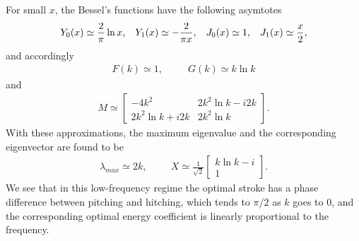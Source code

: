 For small $x$, the Bessel's functions have the following asymtotes
\begin{align}
Y_0(x)  \simeq  \frac{2}{\pi} \ln x,  \hspace{3mm} 
Y_1(x)  \simeq  -\frac{2}{\pi x}, \hspace{3mm}
J_0(x) \simeq 1, \hspace{3mm}
J_1(x) \simeq \frac{x}{2},
\end{align}
and accordingly
\begin{align}
F(k) \simeq 1,  \hspace{30pt}   G(k) \simeq k \ln k
\end{align}
and
\begin{align}
M \simeq \begin{bmatrix} 
-4k^2   &  2k^2 \ln k - i2k  \\
2k^2 \ln k + i2k  &   2k^2 \ln k 
\end{bmatrix}.
\end{align}
With these approximations, the maximum eigenvalue and the corresponding eigenvector are found to be
\begin{align}
\lambda_{max} \simeq 2k,   \hspace{1cm}
X \simeq   \frac{1}{\sqrt{2}}
\begin{bmatrix} k \ln k - i \\  1   \end{bmatrix}.
\end{align}
We see that in this low-frequency regime the optimal stroke has a phase difference between pitching and hitching, which tends to $\pi/2$ as $k$ goes to 0, and the corresponding optimal energy coefficient is linearly proportional to the frequency.

